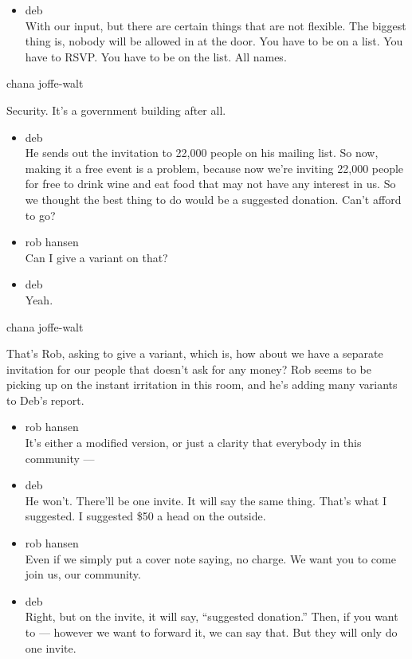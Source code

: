 \begin{itemize}
\tightlist
\item
  deb\\
  With our input, but there are certain things that are not flexible.
  The biggest thing is, nobody will be allowed in at the door. You have
  to be on a list. You have to RSVP. You have to be on the list. All
  names.
\end{itemize}

chana joffe-walt

Security. It's a government building after all.

\begin{itemize}
\item
  deb\\
  He sends out the invitation to 22,000 people on his mailing list. So
  now, making it a free event is a problem, because now we're inviting
  22,000 people for free to drink wine and eat food that may not have
  any interest in us. So we thought the best thing to do would be a
  suggested donation. Can't afford to go?
\item
  rob hansen\\
  Can I give a variant on that?
\item
  deb\\
  Yeah.
\end{itemize}

chana joffe-walt

That's Rob, asking to give a variant, which is, how about we have a
separate invitation for our people that doesn't ask for any money? Rob
seems to be picking up on the instant irritation in this room, and he's
adding many variants to Deb's report.

\begin{itemize}
\item
  rob hansen\\
  It's either a modified version, or just a clarity that everybody in
  this community ---
\item
  deb\\
  He won't. There'll be one invite. It will say the same thing. That's
  what I suggested. I suggested \$50 a head on the outside.
\item
  rob hansen\\
  Even if we simply put a cover note saying, no charge. We want you to
  come join us, our community.
\item
  deb\\
  Right, but on the invite, it will say, ``suggested donation.'' Then,
  if you want to --- however we want to forward it, we can say that. But
  they will only do one invite.
\end{itemize}

